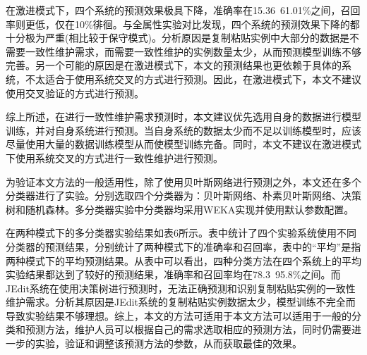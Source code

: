 在激进模式下，四个系统的预测效果极具下降，准确率在15.36~61.01\%之间，召回率则更低，仅在10\%徘徊。与全属性实验对比发现，四个系统的预测效果下降的都十分极为严重(相比较于保守模式)。分析原因是复制粘贴实例中大部分的数据是不需要一致性维护需求，而需要一致性维护的实例数量太少，从而预测模型训练不够完善。另一个可能的原因是在激进模式下，本文的预测结果也更依赖于具体的系统，不太适合于使用系统交叉的方式进行预测。因此，在激进模式下，本文不建议使用交叉验证的方式进行预测。

综上所述，在进行一致性维护需求预测时，本文建议优先选用自身的数据进行模型训练，并对自身系统进行预测。当自身系统的数据太少而不足以训练模型时，应该尽量使用大量的数据训练模型从而使模型训练完备。同时，本文不建议在激进模式下使用系统交叉的方式进行一致性维护进行预测。


为验证本文方法的一般适用性，除了使用贝叶斯网络进行预测之外，本文还在多个分类器进行了实验。分别选取四个分类器为：贝叶斯网络、朴素贝叶斯网络、决策树和随机森林。多分类器实验中分类器均采用WEKA实现并使用默认参数配置。

在两种模式下的多分类器实验结果如表6所示。表中统计了四个实验系统使用不同分类器的预测结果，分别统计了两种模式下的准确率和召回率，表中的“平均”是指两种模式下的平均预测结果。从表中可以看出，四种分类方法在四个系统上的平均实验结果都达到了较好的预测结果，准确率和召回率均在78.3~95.8\%之间。而JEdit系统在使用决策树进行预测时，无法正确预测和识别复制粘贴实例的一致性维护需求。分析其原因是JEdit系统的复制粘贴实例数据太少，模型训练不完全而导致实验结果不够理想。综上，本文的方法可适用于本文方法可以适用于一般的分类和预测方法，维护人员可以根据自己的需求选取相应的预测方法，同时仍需要进一步的实验，验证和调整该预测方法的参数，从而获取最佳的效果。


